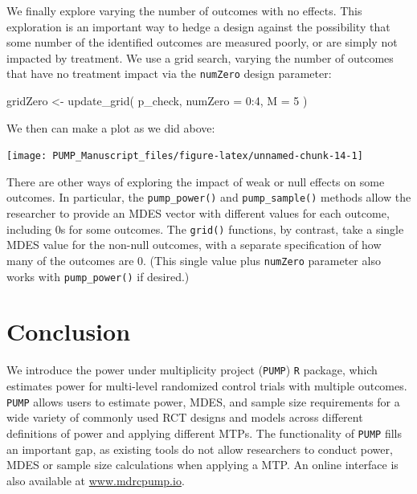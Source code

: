 \documentclass[
]{article}
\newenvironment{Shaded}{\begin{snugshade}}{\end{snugshade}}
\newcommand{\AttributeTok}[1]{\textcolor[rgb]{0.77,0.63,0.00}{#1}}
\newcommand{\DecValTok}[1]{\textcolor[rgb]{0.00,0.00,0.81}{#1}}
\newcommand{\FunctionTok}[1]{\textcolor[rgb]{0.00,0.00,0.00}{#1}}
\newcommand{\NormalTok}[1]{#1}
\newcommand{\OtherTok}[1]{\textcolor[rgb]{0.56,0.35,0.01}{#1}}
\newcommand{\SpecialCharTok}[1]{\textcolor[rgb]{0.00,0.00,0.00}{#1}}
\begin{document}
We finally explore varying the number of outcomes with no effects. This
exploration is an important way to hedge a design against the
possibility that some number of the identified outcomes are measured
poorly, or are simply not impacted by treatment. We use a grid search,
varying the number of outcomes that have no treatment impact via the
\texttt{numZero} design parameter:

\begin{Shaded}
\begin{Highlighting}[]
\NormalTok{gridZero }\OtherTok{\textless{}{-}} \FunctionTok{update\_grid}\NormalTok{( p\_check,}
            \AttributeTok{numZero =} \DecValTok{0}\SpecialCharTok{:}\DecValTok{4}\NormalTok{,}
            \AttributeTok{M =} \DecValTok{5}\NormalTok{ )}
\end{Highlighting}
\end{Shaded}

We then can make a plot as we did above:

\begin{center}\texttt{[image: PUMP\_Manuscript\_files/figure-latex/unnamed-chunk-14-1]} \end{center}

There are other ways of exploring the impact of weak or null effects on
some outcomes. In particular, the \texttt{pump\_power()} and
\texttt{pump\_sample()} methods allow the researcher to provide an MDES
vector with different values for each outcome, including 0s for some
outcomes. The \texttt{grid()} functions, by contrast, take a single MDES
value for the non-null outcomes, with a separate specification of how
many of the outcomes are 0. (This single value plus \texttt{numZero}
parameter also works with \texttt{pump\_power()} if desired.)

\section{Conclusion}
\label{sec:conclusion}

We introduce the power under multiplicity project (\texttt{PUMP})
\texttt{R} package, which estimates power for multi-level randomized
control trials with multiple outcomes. \texttt{PUMP} allows users to
estimate power, MDES, and sample size requirements for a wide variety of
commonly used RCT designs and models across different definitions of
power and applying different MTPs. The functionality of \texttt{PUMP}
fills an important gap, as existing tools do not allow researchers to
conduct power, MDES or sample size calculations when applying a MTP. An
online interface is also available at \url{www.mdrcpump.io}.
\end{document}
